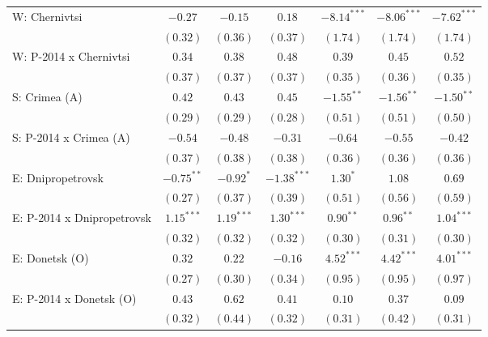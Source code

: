 \begin{table}
\begin{center}
\begin{small}
\begin{tabular}{l c c c c c c}
W: Chernivtsi               & $-0.27$       & $-0.15$      & $0.18$        & $-8.14^{***}$  & $-8.06^{***}$  & $-7.62^{***}$  \\
                            & $(0.32)$      & $(0.36)$     & $(0.37)$      & $(1.74)$       & $(1.74)$       & $(1.74)$       \\
W: P-2014 x Chernivtsi      & $0.34$        & $0.38$       & $0.48$        & $0.39$         & $0.45$         & $0.52$         \\
                            & $(0.37)$      & $(0.37)$     & $(0.37)$      & $(0.35)$       & $(0.36)$       & $(0.35)$       \\
S: Crimea (A)               & $0.42$        & $0.43$       & $0.45$        & $-1.55^{**}$   & $-1.56^{**}$   & $-1.50^{**}$   \\
                            & $(0.29)$      & $(0.29)$     & $(0.28)$      & $(0.51)$       & $(0.51)$       & $(0.50)$       \\
S: P-2014 x Crimea (A)      & $-0.54$       & $-0.48$      & $-0.31$       & $-0.64$        & $-0.55$        & $-0.42$        \\
                            & $(0.37)$      & $(0.38)$     & $(0.38)$      & $(0.36)$       & $(0.36)$       & $(0.36)$       \\
E: Dnipropetrovsk           & $-0.75^{**}$  & $-0.92^{*}$  & $-1.38^{***}$ & $1.30^{*}$     & $1.08$         & $0.69$         \\
                            & $(0.27)$      & $(0.37)$     & $(0.39)$      & $(0.51)$       & $(0.56)$       & $(0.59)$       \\
E: P-2014 x Dnipropetrovsk  & $1.15^{***}$  & $1.19^{***}$ & $1.30^{***}$  & $0.90^{**}$    & $0.96^{**}$    & $1.04^{***}$   \\
                            & $(0.32)$      & $(0.32)$     & $(0.32)$      & $(0.30)$       & $(0.31)$       & $(0.30)$       \\
E: Donetsk (O)              & $0.32$        & $0.22$       & $-0.16$       & $4.52^{***}$   & $4.42^{***}$   & $4.01^{***}$   \\
                            & $(0.27)$      & $(0.30)$     & $(0.34)$      & $(0.95)$       & $(0.95)$       & $(0.97)$       \\
E: P-2014 x Donetsk (O)     & $0.43$        & $0.62$       & $0.41$        & $0.10$         & $0.37$         & $0.09$         \\
                            & $(0.32)$      & $(0.44)$     & $(0.32)$      & $(0.31)$       & $(0.42)$       & $(0.31)$       \\

\end{tabular}
\end{small}
\end{center}
\end{table}
